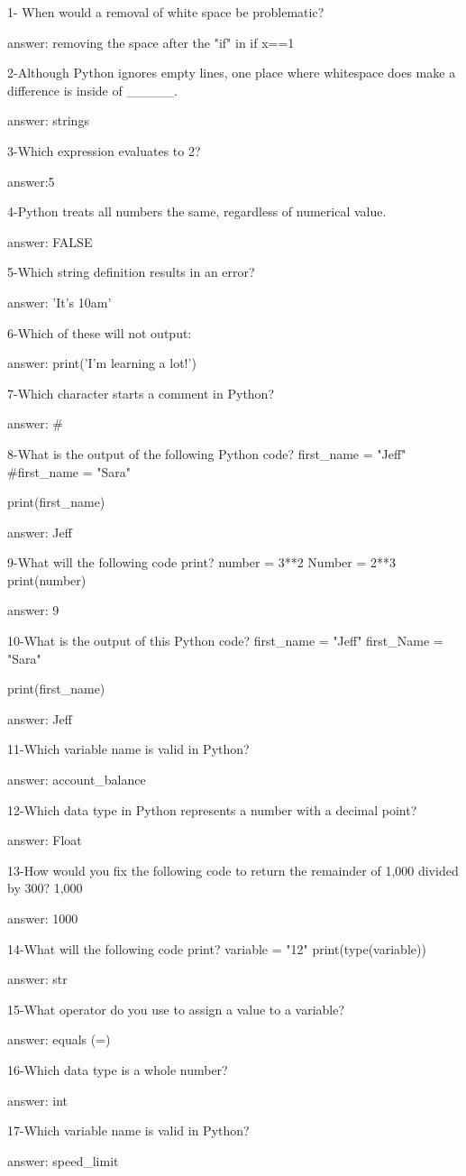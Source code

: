 1- When would a removal of white space be problematic?

answer: removing the space after the "if" in if x==1

2-Although Python ignores empty lines, one place where whitespace does make a difference is inside of _____.

answer: strings

3-Which expression evaluates to 2?

answer:5 %

4-Python treats all numbers the same, regardless of numerical value.

answer: FALSE

5-Which string definition results in an error?

answer: 'It's 10am'

6-Which of these will not output:

answer: print('I'm learning a lot!')

7-Which character starts a comment in Python?

answer: #

8-What is the output of the following Python code?
first_name = "Jeff"
 #first_name = "Sara"

 print(first_name)

answer: Jeff

9-What will the following code print?
number = 3**2
 Number = 2**3
 print(number)

answer: 9

10-What is the output of this Python code?
first_name = "Jeff"
 first_Name = "Sara"

 print(first_name)

answer: Jeff

11-Which variable name is valid in Python?

answer: account_balance

12-Which data type in Python represents a number with a decimal point?

answer: Float

13-How would you fix the following code to return the remainder of 1,000 divided by 300?
1,000 %

answer: 1000 %

14-What will the following code print?
variable = "12"
 print(type(variable))

answer: str

15-What operator do you use to assign a value to a variable?

answer: equals (=)

16-Which data type is a whole number?

answer: int

17-Which variable name is valid in Python?

answer: speed_limit
